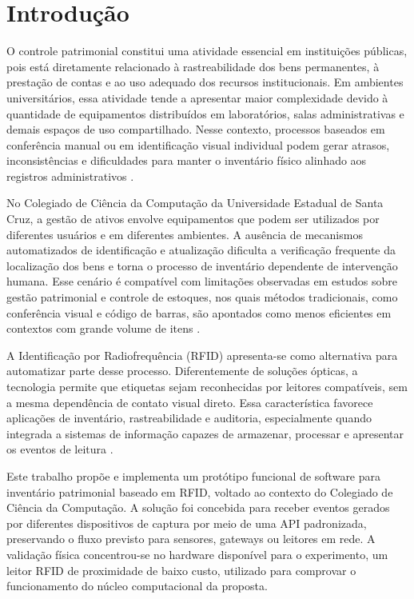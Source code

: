 \chapter{Introdução}

O controle patrimonial constitui uma atividade essencial em instituições públicas, pois está diretamente relacionado à rastreabilidade dos bens permanentes, à prestação de contas e ao uso adequado dos recursos institucionais. Em ambientes universitários, essa atividade tende a apresentar maior complexidade devido à quantidade de equipamentos distribuídos em laboratórios, salas administrativas e demais espaços de uso compartilhado. Nesse contexto, processos baseados em conferência manual ou em identificação visual individual podem gerar atrasos, inconsistências e dificuldades para manter o inventário físico alinhado aos registros administrativos \cite{tceba2018}.

No Colegiado de Ciência da Computação da Universidade Estadual de Santa Cruz, a gestão de ativos envolve equipamentos que podem ser utilizados por diferentes usuários e em diferentes ambientes. A ausência de mecanismos automatizados de identificação e atualização dificulta a verificação frequente da localização dos bens e torna o processo de inventário dependente de intervenção humana. Esse cenário é compatível com limitações observadas em estudos sobre gestão patrimonial e controle de estoques, nos quais métodos tradicionais, como conferência visual e código de barras, são apontados como menos eficientes em contextos com grande volume de itens \cite{brito2019}.

A Identificação por Radiofrequência (RFID) apresenta-se como alternativa para automatizar parte desse processo. Diferentemente de soluções ópticas, a tecnologia permite que etiquetas sejam reconhecidas por leitores compatíveis, sem a mesma dependência de contato visual direto. Essa característica favorece aplicações de inventário, rastreabilidade e auditoria, especialmente quando integrada a sistemas de informação capazes de armazenar, processar e apresentar os eventos de leitura \cite{alwadi2017,mashayekhy2022}.

Este trabalho propõe e implementa um protótipo funcional de software para inventário patrimonial baseado em RFID, voltado ao contexto do Colegiado de Ciência da Computação. A solução foi concebida para receber eventos gerados por diferentes dispositivos de captura por meio de uma API padronizada, preservando o fluxo previsto para sensores, gateways ou leitores em rede. A validação física concentrou-se no hardware disponível para o experimento, um leitor RFID de proximidade de baixo custo, utilizado para comprovar o funcionamento do núcleo computacional da proposta.

